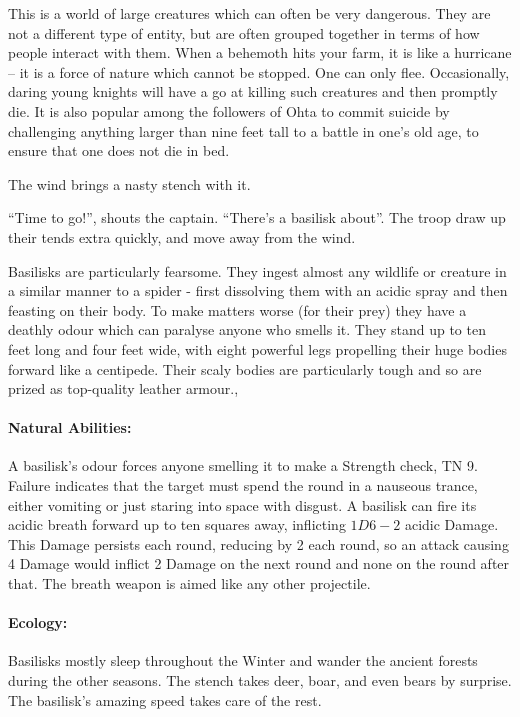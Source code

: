 This is a world of large creatures which can often be very dangerous.  They are not a different type of entity, but are often grouped together in terms of how people interact with them.  When a behemoth hits your farm, it is like a hurricane -- it is a force of nature which cannot be stopped.  One can only flee.  Occasionally, daring young knights will have a go at killing such creatures and then promptly die.  It is also popular among the followers of Ohta to commit suicide by challenging anything larger than nine feet tall to a battle in one's old age, to ensure that one does not die in bed.

\label{basilisk}
\basilisk

\begin{boxtext}

	The wind brings a nasty stench with it.

	``Time to go!'', shouts the captain.  ``There's a basilisk about''.  The troop draw up their tends extra quickly, and move away from the wind.

\end{boxtext}

Basilisks are particularly fearsome.  They ingest almost any wildlife or creature in a similar manner to a spider - first dissolving them with an acidic spray and then feasting on their body.  To make matters worse (for their prey) they have a deathly odour which can paralyse anyone who smells it.  They stand up to ten feet long and four feet wide, with eight powerful legs propelling their huge bodies forward like a centipede.  Their scaly bodies are particularly tough and so are prized as top-quality leather armour.,

	\paragraph{Natural Abilities:} A basilisk's odour forces anyone smelling it to make a Strength check, TN 9.  Failure indicates that the target must spend the round in a nauseous trance, either vomiting or just staring into space with disgust.  A basilisk can fire its acidic breath forward up to ten squares away, inflicting $1D6-2$ acidic Damage.  This Damage persists each round, reducing by 2  each round, so an attack causing 4 Damage would inflict 2  Damage on the next round and none on the round after that.  The breath weapon is aimed like any other projectile.

	\paragraph{Ecology:} Basilisks mostly sleep throughout the Winter and wander the ancient forests during the other seasons.  The stench takes deer, boar, and even bears by surprise.  The basilisk's amazing speed takes care of the rest.

